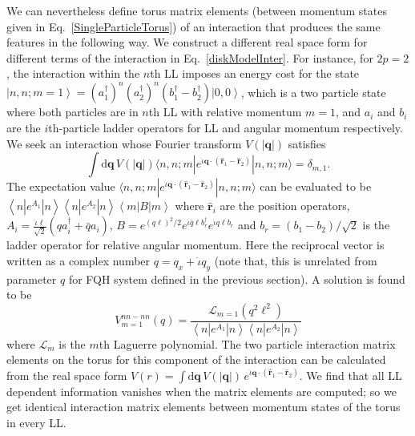 \documentclass[prb,aps,epsfig,longbibliography,twocolumn]{revtex4-1}
\newcommand{\bsym}[1]{\boldsymbol{#1}}
\newcommand{\iiota}{\dot{\iota}}
\begin{document}
We can nevertheless define torus matrix elements (between momentum states given in Eq.~\eqref{SingleParticleTorus}) of an interaction that produces the same features in the following way.  We construct a different real space form for different terms of the interaction in Eq.~\eqref{diskModelInter}. For instance, for $2p=2$, the interaction within the $n$th LL imposes an energy cost for the state $\left| n,n;m=1 \right\rangle = (a_1^\dagger)^n (a_2^\dagger)^n (b_1^\dagger-b_2^\dagger)\left|0,0\right\rangle$, which is a two particle state where both particles are in $n$th LL with relative momentum $m=1$, and $a_i$ and  $b_i$ are the $i$th-particle ladder operators for LL and  angular momentum respectively. We seek an interaction whose Fourier transform $V(|\bsym{q}|)$ satisfies
\begin{equation}
\int \text{d}\bsym{q}\, V(|\bsym{q}|) \langle n,n;m |e^{{\iiota}\bsym{q}\cdot {(\bsym{\hat{r}}_1-\bsym{\hat{r}}_2)}} | n,n;m \rangle   =\delta_{m,1}.
\end{equation}
 The expectation value $\langle n,n;m |e^{{\iiota}\bsym{q}\cdot {(\bsym{\hat{r}}_1-\bsym{\hat{r}}_2)}} | n,n;m \rangle$ can be evaluated to be $ \left\langle n |e^{A_1}|n \right\rangle  \left\langle n |e^{A_2}|n \right\rangle  \left\langle m| B|m \right\rangle $ where $\bsym{\hat{r}}_i$ are the position operators,  $A_i=\frac{\iiota \ell}{\sqrt{2}}(qa_i^\dagger + \bar{q}a_i)$,   $B=e^{(q\ell)^2/2}e^{\iiota\bar{q}\ell b_r^\dagger}e^{\iiota q\ell b_r}$ and $b_r=(b_1-b_2)/\sqrt{2}$ is the ladder operator for relative angular momentum. Here the reciprocal vector is written as a complex number $q=q_x+\iiota q_y$ (note that, this is unrelated from parameter $q$ for FQH system defined in the previous section). A solution is found to be 
\begin{equation}
V_{m=1}^{nn-nn}(q)=\frac{\mathcal{L}_{m=1}(q^2\ell^2)}{ \left\langle n |e^{A_1}|n \right\rangle \left\langle n |e^{A_2}|n \right\rangle} \label{vq1Intra}
\end{equation}
where $\mathcal{L}_m$ is the $m$th Laguerre polynomial.
The two particle interaction matrix elements on the torus for this component of the interaction can be calculated from the real space form $V(r)=\int\text{d}\bsym{q}\, V(|\bsym{q}|)\, e^{{\iiota}\bsym{q}\cdot {(\bsym{\hat{r}}_1-\bsym{\hat{r}}_2)}}$. We find that all LL dependent information vanishes when the matrix elements are computed; so we get identical interaction matrix elements between momentum states of the torus in every LL.
\end{document}
